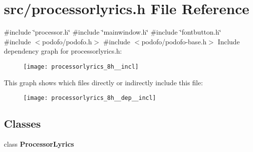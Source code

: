\section{src/processorlyrics.h File Reference}
\label{processorlyrics_8h}
{\ttfamily \#include \char`\"{}processor.\+h\char`\"{}}\newline
{\ttfamily \#include \char`\"{}mainwindow.\+h\char`\"{}}\newline
{\ttfamily \#include \char`\"{}fontbutton.\+h\char`\"{}}\newline
{\ttfamily \#include $<$podofo/podofo.\+h$>$}\newline
{\ttfamily \#include $<$podofo/podofo-\/base.\+h$>$}\newline
Include dependency graph for processorlyrics.\+h\+:\nopagebreak
\begin{figure}[H]
\begin{center}
\leavevmode
\texttt{[image: processorlyrics\_8h\_\_incl]}
\end{center}
\end{figure}
This graph shows which files directly or indirectly include this file\+:\nopagebreak
\begin{figure}[H]
\begin{center}
\leavevmode
\texttt{[image: processorlyrics\_8h\_\_dep\_\_incl]}
\end{center}
\end{figure}
\subsection*{Classes}
\begin{DoxyCompactItemize}
\item 
class \textbf{ Processor\+Lyrics}
\end{DoxyCompactItemize}
